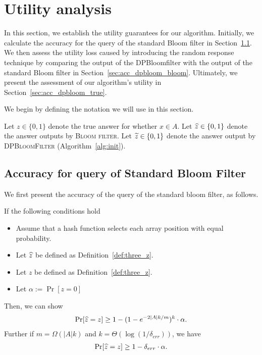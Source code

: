 
\section{Utility analysis}\label{sec:appendix_utility}
In this section, we establish the utility guarantees for our algorithm. Initially, we calculate the accuracy for the query of the standard Bloom filter in Section~\ref{sec:acc_bloom}. We then assess the utility loss caused by introducing the random response technique by comparing the output of the DPBloomfilter with the output of the standard Bloom filter in Section~\ref{sec:acc_dpbloom_bloom}. Ultimately, we present the assessment of our algorithm's utility in Section~\ref{sec:acc_dpbloom_true}.

We begin by defining the notation we will use in this section.
\begin{definition}\label{def:three_z}
    Let $z \in \{0,1\}$ denote the true answer for whether $x \in A$. Let $\widehat{z} \in \{0,1\}$ denote the answer outputs by \textsc{Bloom filter}. Let $\widetilde{z} \in \{0,1\}$ denote the answer output by \textsc{DPBloomFilter} (Algorithm~\ref{alg:init}).
\end{definition}

\subsection{Accuracy for query of Standard Bloom Filter}\label{sec:acc_bloom}

We first present the accuracy of the query of the standard bloom filter, as follows.

\begin{lemma}\label{lem:bloom_true_accuracy:formal}
If the following conditions hold
\begin{itemize}
    \item Assume that a hash function selects each array position with equal probability. 
    \item Let $\widehat{z}$ be defined as Definition~\ref{def:three_z}.
    \item Let $z$ be defined as Definition~\ref{def:three_z}.
    \item Let $\alpha := \Pr[z=0]$
\end{itemize}
Then, we can show
\begin{align*}
    \Pr [ \widehat{z} = z ] \geq 1 - (1 - e^{-2|A| k / m})^k \cdot \alpha.
\end{align*}
Further if $m = \Omega(|A| k)$ and $k = \Theta(\log(1/\delta_{err}))$, we have
\begin{align*}
     \Pr [ \widehat{z} = z ] \geq 1 - \delta_{err} \cdot \alpha.
\end{align*}
\end{lemma}

